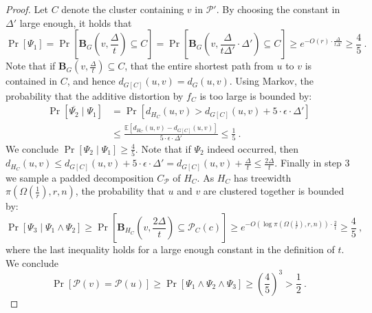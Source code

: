 \documentclass{article}
\newcommand{\E}{{\mathbb{E}}}
\def\cP{\ensuremath{\mathcal{P}}}
\def\ball{\mathbf{B}}
\begin{document}
\begin{proof}
	Let $C$ denote the cluster containing $v$ in $\cP'$. By choosing the constant in $\Delta'$ large enough, it holds that 
	\[
	\Pr\left[\Psi_1\right]=\Pr\left[\ball_{G}(v,\frac{\Delta}{t})\subseteq C\right]=\Pr\left[\ball_{G}(v,\frac{\Delta}{t\Delta'}\cdot\Delta')\subseteq C\right]\ge e^{-O(r)\cdot\frac{\Delta}{t\Delta'}}\ge\frac{4}{5}~.
	\]
	Note that if $\ball_{G}(v,\frac{\Delta}{t})\subseteq C$, that the entire shortest path from $u$ to $v$ is contained in $C$, and hence $d_{G[C]}(u,v)=d_{G}(u,v)$.
	Using Markov, the probability that the additive distortion by $f_C$ is too large is bounded by:
	\begin{align*}
		\Pr\left[\overline{\Psi_{2}}\mid\Psi_{1}\right] & =\Pr\left[d_{H_{C}}(u,v)> d_{G[C]}(u,v)+5\cdot\epsilon\cdot\Delta'\right]\\
		& \le\frac{\E\left[d_{H_{C}}(u,v)-d_{G[C]}(u,v)\right]}{5\cdot\epsilon\cdot\Delta'}\le\frac{1}{5}~.
	\end{align*}
	We conclude $\Pr\left[\Psi_{2}\mid\Psi_{1}\right]\ge\frac{4}{5}$.
	Note that if $\Psi_{2}$ indeed occurred, then  $d_{H_{C}}(u,v)\le d_{G[C]}(u,v)+5\cdot\epsilon\cdot\Delta'=d_{G[C]}(u,v)+\frac{\Delta}{t}\le \frac{2\Delta}{t}$.
	Finally in step 3 we sample a padded decomposition $C_\cP$ of $H_C$. 
	As $H_C$ has treewidth $\pi(\Omega(\frac1r),r,n)$, the probability that $u$ and $v$ are clustered together is bounded by:
	\[
	\Pr\left[\Psi_{3}\mid\Psi_{1}\wedge\Psi_{2}\right]\ge\Pr\left[\ball_{H_{C}}(v,\frac{2\Delta}{t})\subseteq\cP_{C}(c)\right]\ge e^{-O(\log\pi(\Omega(\frac{1}{r}),r,n))\cdot\frac{2}{t}}\ge\frac{4}{5}~,
	\]
	where the last inequality holds for a large enough constant in the definition of $t$.
	We conclude
	\[
	\Pr\left[\cP(v)=\cP(u)\right]\ge\Pr\left[\Psi_{1}\wedge\Psi_{2}\wedge\Psi_{3}\right]\ge\left(\frac{4}{5}\right)^{3}>\frac{1}{2}~.
	\]
\end{proof}




\end{document}
